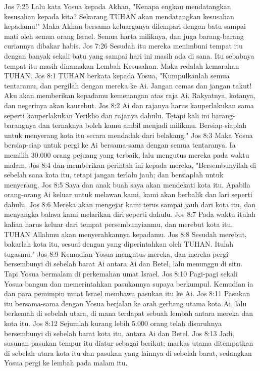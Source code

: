 Jos 7:25  Lalu kata Yosua kepada Akhan, "Kenapa engkau mendatangkan kesusahan kepada kita? Sekarang TUHAN akan mendatangkan kesusahan kepadamu!" Maka Akhan bersama keluarganya dilempari dengan batu sampai mati oleh semua orang Israel. Semua harta miliknya, dan juga barang-barang curiannya dibakar habis.
Jos 7:26  Sesudah itu mereka menimbuni tempat itu dengan banyak sekali batu yang sampai hari ini masih ada di sana. Itu sebabnya tempat itu masih dinamakan Lembah Kesusahan. Maka redalah kemarahan TUHAN.
Jos 8:1  TUHAN berkata kepada Yosua, "Kumpulkanlah semua tentaramu, dan pergilah dengan mereka ke Ai. Jangan cemas dan jangan takut! Aku akan memberikan kepadamu kemenangan atas raja Ai. Rakyatnya, kotanya, dan negerinya akan kaurebut.
Jos 8:2  Ai dan rajanya harus kauperlakukan sama seperti kauperlakukan Yerikho dan rajanya dahulu. Tetapi kali ini barang-barangnya dan ternaknya boleh kamu ambil menjadi milikmu. Bersiap-siaplah untuk menyerang kota itu secara mendadak dari belakang."
Jos 8:3  Maka Yosua bersiap-siap untuk pergi ke Ai bersama-sama dengan semua tentaranya. Ia memilih 30.000 orang pejuang yang terbaik, lalu mengutus mereka pada waktu malam,
Jos 8:4  dan memberikan perintah ini kepada mereka, "Bersembunyilah di sebelah sana kota itu, tetapi jangan terlalu jauh; dan bersiaplah untuk menyerang.
Jos 8:5  Saya dan anak buah saya akan mendekati kota itu. Apabila orang-orang Ai keluar untuk melawan kami, kami akan berbalik dan lari seperti dahulu.
Jos 8:6  Mereka akan mengejar kami terus sampai jauh dari kota itu, dan menyangka bahwa kami melarikan diri seperti dahulu.
Jos 8:7  Pada waktu itulah kalian harus keluar dari tempat persembunyianmu, dan merebut kota itu. TUHAN Allahmu akan menyerahkannya kepadamu.
Jos 8:8  Sesudah merebut, bakarlah kota itu, sesuai dengan yang diperintahkan oleh TUHAN. Itulah tugasmu."
Jos 8:9  Kemudian Yosua mengutus mereka, dan mereka pergi bersembunyi di sebelah barat Ai antara Ai dan Betel, lalu menunggu di situ. Tapi Yosua bermalam di perkemahan umat Israel.
Jos 8:10  Pagi-pagi sekali Yosua bangun dan memerintahkan pasukannya supaya berkumpul. Kemudian ia dan para pemimpin umat Israel membawa pasukan itu ke Ai.
Jos 8:11  Pasukan itu bersama-sama dengan Yosua berjalan ke arah gerbang utama kota Ai, lalu berkemah di sebelah utara, di mana terdapat sebuah lembah antara mereka dan kota itu.
Jos 8:12  Sejumlah kurang lebih 5.000 orang telah disuruhnya bersembunyi di sebelah barat kota itu, antara Ai dan Betel.
Jos 8:13  Jadi, susunan pasukan tempur itu diatur sebagai berikut: markas utama ditempatkan di sebelah utara kota itu dan pasukan yang lainnya di sebelah barat, sedangkan Yosua pergi ke lembah pada malam itu.
